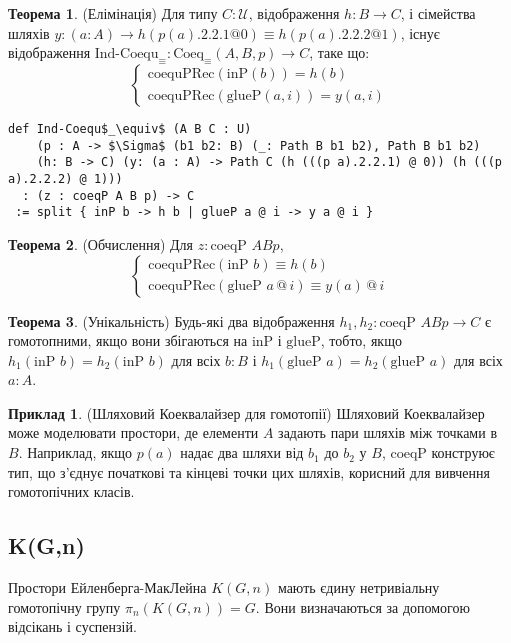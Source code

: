 \documentclass{article}
\theoremstyle{definition}
\newtheorem{theorem}{Теорема}
\newtheorem{example}{Приклад}
\begin{document}
\begin{theorem} (Елімінація)
Для типу \( C : \mathcal{U} \), відображення \( h : B \to C \),
і сімейства шляхів \( y : (a : A) \to h(p(a).2.2.1  @ 0) \equiv h(p(a).2.2.2 @ 1) \),
існує відображення \( \text{Ind-Coequ}_\equiv : \text{Coeq}_\equiv(A,B,p) \to C \), таке що:
\[
\begin{cases}
\text{coequPRec}(\text{inP}(b)) = h(b) \\
\text{coequPRec}(\text{glueP}(a,i)) = y(a,i)
\end{cases}
\]
\begin{lstlisting}[mathescape=true]
def Ind-Coequ$_\equiv$ (A B C : U)
    (p : A -> $\Sigma$ (b1 b2: B) (_: Path B b1 b2), Path B b1 b2)
    (h: B -> C) (y: (a : A) -> Path C (h (((p a).2.2.1) @ 0)) (h (((p a).2.2.2) @ 1)))
  : (z : coeqP A B p) -> C
 := split { inP b -> h b | glueP a @ i -> y a @ i }
\end{lstlisting}
\end{theorem}

\begin{theorem} (Обчислення)
Для \( z : \text{coeqP } A B p \),
\[
\begin{cases}
\text{coequPRec}(\text{inP } b) \equiv h(b) \\
\text{coequPRec}(\text{glueP } a \, @ \, i) \equiv y(a) \, @ \, i
\end{cases}
\]
\end{theorem}

\begin{theorem} (Унікальність)
Будь-які два відображення \( h_1, h_2 : \text{coeqP } A B p \to C \) є гомотопними,
якщо вони збігаються на \( \text{inP} \) і \( \text{glueP} \), тобто,
якщо \( h_1(\text{inP } b) = h_2(\text{inP } b) \) для всіх \( b : B \)
і \( h_1(\text{glueP } a) = h_2(\text{glueP } a) \) для всіх \( a : A \).
\end{theorem}

\begin{example} (Шляховий Коеквалайзер для гомотопії)
Шляховий Коеквалайзер може моделювати простори, де елементи \( A \) задають
пари шляхів між точками в \( B \). Наприклад, якщо \( p(a) \) надає
два шляхи від \( b_1 \) до \( b_2 \) у \( B \), \( \text{coeqP} \) конструює тип,
що з’єднує початкові та кінцеві точки цих шляхів,
корисний для вивчення гомотопічних класів.
\end{example}

\subsection{K(G,n)}
Простори Ейленберга-МакЛейна \( K(G,n) \) мають єдину нетривіальну
гомотопічну групу \( \pi_n(K(G,n)) = G \). Вони визначаються за допомогою відсікань і суспензій.
\end{document}
